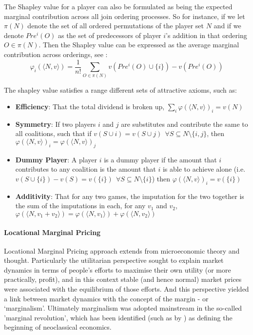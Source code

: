 \documentclass[
10pt, %
a4paper, %
oneside, %
headinclude,footinclude, %
BCOR5mm, %
]{scrartcl}
\begin{document}
The Shapley value for a player can also be formulated as being the expected marginal contribution across all join ordering processes.
So for instance, if we let $\pi(N)$ denote the set of all ordered permutations of the player set $N$ and if we denote $Pre^i(O)$ as the set of predecessors of player $i$'s addition in that ordering $O\in \pi(N)$. Then the Shapley value can be expressed as the average marginal contribution across orderings, see \cite{weber_1988}:
\begin{equation}\label{shapley_value3}
    \varphi_i(\langle N,v\rangle) = \frac{1}{n!}\sum_{O\in\pi(N)}v(Pre^i(O)\cup\{i\})-v(Pre^i(O))
\end{equation}

The shapley value satisfies a range different sets of attractive axioms, such as:
\begin{itemize}
\item	\textbf{Efficiency}: That the total dividend is broken up, $\sum_i\varphi(\langle N,v\rangle)_i = v(N)$
\item	\textbf{Symmetry}: If two players $i$ and $j$ are substitutes and contribute the same to all coalitions, such that if $v(S\cup i)=v(S\cup j)~~\forall S\subseteq N\setminus\{i,j\}$, then $\varphi(\langle N,v\rangle)_i = \varphi(\langle N,v\rangle)_j$
\item	\textbf{Dummy Player}: A player $i$ is a dummy player if the amount that $i$ contributes to any coalition is the amount that $i$ is able to achieve alone (i.e.\ $v(S\cup \{i\})-v(S)=v(\{i\})~~\forall S\subseteq N\setminus\{i\}$) then $\varphi(\langle N,v\rangle)_i=v(\{i\})$
\item	\textbf{Additivity}: That for any two games, the imputation for the two together is the sum of the imputations in each, for any $v_1$ and $v_2$, $\varphi(\langle N,v_1+v_2\rangle)=\varphi(\langle N,v_1 \rangle) + \varphi(\langle N,v_2\rangle)$
\end{itemize}

\paragraph{Locational Marginal Pricing}

Locational Marginal Pricing approach extends from microeconomic theory and thought.
Particularly the utilitarian perspective sought to explain market dynamics in terms of people's efforts to maximise their own utility (or more practically, profit), and in this context stable (and hence normal) market prices were associated with the equilibrium of those efforts.
And this perspective yielded a link between market dynamics with the concept of the margin - or `marginalism'.
Ultimately marginalism was adopted mainstream in the so-called 'marginal revolution', which has been identified (such as by \cite{marginalism1}) as defining the beginning of neoclassical economics.
\end{document}
